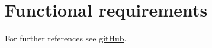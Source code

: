 \documentclass[a4paper,12pt]{report}
\begin{document}

\section{Functional requirements}
For further references see \href{http://www.sharelatex.com}{gitHub}.
\end{document}
